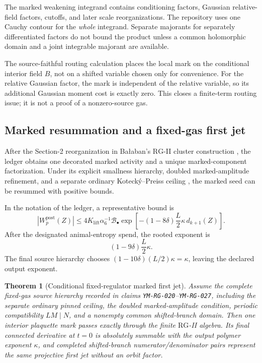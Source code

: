 \documentclass[11pt]{article}
\newtheorem{theorem}{Theorem}[section]
\theoremstyle{definition}
\newcommand{\RG}{\mathrm{RG}}
\newcommand{\claim}[1]{\texttt{#1}}
\begin{document}
The marked weakening integrand contains conditioning factors, Gaussian
relative-field factors, cutoffs, and later scale reorganizations.  The
repository uses one Cauchy contour for the \emph{whole} integrand.  Separate
majorants for separately differentiated factors do not bound the product
unless a common holomorphic domain and a joint integrable majorant are
available.

The source-faithful routing calculation places the local mark on the
conditional interior field \(B\), not on a shifted variable chosen only for
convenience.  For the relative Gaussian factor, the mark is independent of
the relative variable, so its additional Gaussian moment cost is exactly
zero.  This closes a finite-term routing issue; it is not a proof of a
nonzero-source gas.

\subsection{Marked resummation and a fixed-gas first jet}

After the Section-2 reorganization in Ba{\l}aban's \(\RG\)-II cluster
construction \cite{balaban1988rgii}, the ledger obtains one decorated marked
activity and a unique marked-component factorization.  Under its explicit
smallness hierarchy, doubled marked-amplitude refinement, and a separate
ordinary Koteck\'y--Preiss ceiling \cite{koteckypreiss}, the marked seed
can be resummed with positive bounds.

In the notation of the ledger, a representative bound is
\[
|W_p^{\mathrm{post}}(Z)|
\le
4K_{\mathrm{lift}}\alpha_6^{-1}\mathcal B_\bullet
\exp\!\left[
  -(1-8\delta)\frac L2\kappa\,d_{k+1}(Z)
\right].
\tag{3.1}
\]
After the designated animal-entropy spend, the rooted exponent is
\[
(1-9\delta)\frac L2\kappa.
\tag{3.2}
\]
The final source hierarchy chooses
\((1-10\delta)(L/2)\kappa=\kappa\), leaving the declared output exponent.

\begin{theorem}[Conditional fixed-regulator marked first jet]
\label{thm:marked-first-jet}
Assume the complete fixed-gas source hierarchy recorded in claims
\claim{YM-RG-020}--\claim{YM-RG-027}, including the separate ordinary
pinned ceiling, the doubled marked-amplitude condition, periodic
compatibility \(LM\mid N\), and a nonempty common shifted-branch domain.
Then one interior plaquette mark passes exactly through the finite
\(\RG\)-II algebra.  Its final connected derivative at \(t=0\) is absolutely
summable with the output polymer exponent \(\kappa\), and completed
shifted-branch numerator/denominator pairs represent the same projective
first jet without an orbit factor.
\end{theorem}
\end{document}
